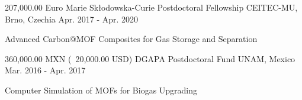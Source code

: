 
\begin{cventries}

    \cventry
    {207,000.00 Euro} %
    {Marie Skłodowska-Curie Postdoctoral Fellowship} %
    {CEITEC-MU, Brno, Czechia} %
    {Apr. 2017 - Apr. 2020} %
    {
      \begin{cvitems} %
        \item {Advanced Carbon{@}MOF Composites for Gas Storage and Separation}
      \end{cvitems}
    }
    \cventry
    {360,000.00 MXN (~20,000.00 USD)} %
    {DGAPA Postdoctoral Fund} %
    {UNAM, Mexico} %
    {Mar. 2016 - Apr. 2017} %
    {
      \begin{cvitems} %
        \item {Computer Simulation of MOFs for Biogas Upgrading}
      \end{cvitems}
    }
    
\end{cventries}
